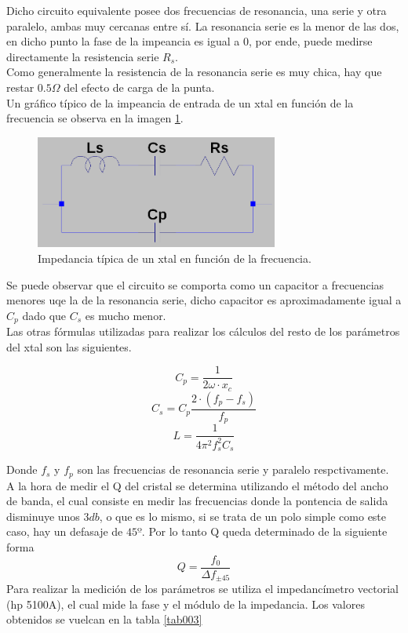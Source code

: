 \documentclass[a4paper,10pt]{article}
\begin{document}
		\indent Dicho circuito equivalente posee dos frecuencias de resonancia,
		una serie y otra paralelo, ambas muy cercanas entre sí. La resonancia 
		serie es la menor de las dos, en dicho punto la fase de la impeancia es
		igual a 0, por ende, puede medirse directamente la resistencia serie 
		$R_s$. \\
		\indent Como generalmente la resistencia de la resonancia serie es muy 
		chica, hay que restar $0.5\Omega$ del efecto de carga de la punta. \\
		\indent Un gráfico típico de la impeancia de entrada de un xtal en 
		función de la frecuencia se observa en la imagen \ref{img005}.
		\begin{figure}[!htb]
			\centering
			\includegraphics[width=8cm]{Imagenes/esqXtal.png}
			\caption{Impedancia típica de un xtal en función de la frecuencia.}
			\label{img005} 
		\end{figure}

		\indent Se puede observar que el circuito se comporta como un capacitor
		a frecuencias menores uqe la de la resonancia serie, dicho capacitor es 
		aproximadamente igual a $C_p$ dado que $C_s$ es mucho menor. \\
		\indent Las otras fórmulas utilizadas para realizar los cálculos del 
		resto de los parámetros del xtal son las siguientes.
		
		$$C_p = \frac{1}{2\omega\cdot x_c}$$
		$$C_s = C_p \frac{2\cdot(f_p - f_s)}{f_p}$$
		$$L = \frac{1}{4\pi^2f_s^2C_s}$$

		\indent Donde $f_s$ y $f_p$ son las frecuencias de resonancia serie y 
		paralelo respctivamente. \\
		\indent A la hora de medir el Q del cristal se determina utilizando el 
		método del ancho de banda, el cual consiste en medir las frecuencias 
		donde la pontencia de salida disminuye unos $3db$, o que es lo mismo, 
		si se trata de un polo simple como este caso, hay un defasaje de $45º$.
		Por lo tanto Q queda determinado de la siguiente forma
		$$Q = \frac{f_0}{\Delta f_{\pm45}}$$
		\indent Para realizar la medición de los parámetros se utiliza el 
		impedancímetro vectorial (hp 5100A), el cual mide la fase y el módulo de
		la impedancia. Los valores obtenidos se vuelcan en la tabla \ref{tab003}
\end{document}
